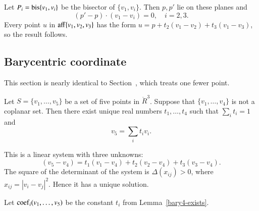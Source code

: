 \begin{tarskidata}
\begin{tarski}
\begin{proved}  Let $P_i={\operatorname{bis}}\{v_1,v_i\}$ 
be the bisector
of $\{v_1,v_i\}$.  Then $p,p'$ lie on these planes and
  $$(p'-p)\cdot (v_1-v_i)=0,\quad i=2,3.$$
Every point $u$ in ${\operatorname{aff}}\{v_1,v_2,v_3\}$
has the form $u=p + t_2(v_1-v_2) + t_3(v_1-v_3)$, so the result
follows.
\swallowed\end{proved}
\end{tarski}








\begin{tarski}
\section{Barycentric coordinate}
This section is nearly identical to Section~, which treats one fewer point.


\begin{lemma}
Let $S=\{v_1,\ldots,v_5\}$ be
a set of five points in $\ring{R}^3$.  Suppose
that $\{v_1,\ldots,v_4\}$ is not a coplanar
set.    Then there exist unique real numbers
$t_1,\ldots,t_4$ such that $\sum_i t_i = 1$ and
	$$v_5 = \sum_i t_i v_i.$$
\end{lemma}

\begin{proved}  This is a linear system with
three unknowns:
	$$(v_5- v_4) = t_1 (v_1-v_4) +
		t_2 (v_2-v_4) + t_3 (v_3-v_4).
	$$
The
square of the
determinant of the system is
$\Delta(x_{ij}) >0$, where $x_{ij}=|v_i-v_j|^2$.
Hence it has a unique solution.
\swallowed\end{proved}
\end{tarski}



\begin{tarski}

\begin{definition}[coef]
Let ${\operatorname{coef}}_i(v_1,\ldots,v_5)$
be the constant $t_i$ from Lemma~\ref{bary4-exists}.
\end{definition}
\end{tarski}





\end{tarskidata}
